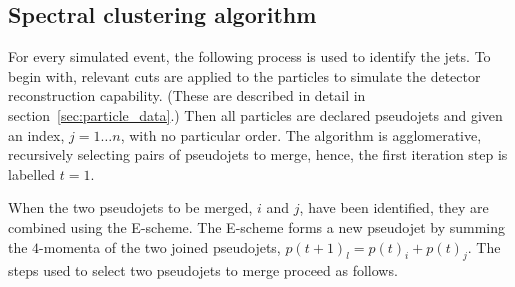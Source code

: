 \subsection{Spectral clustering algorithm}\label{sec:spectralmethodalgo}
    For every simulated event, the following process is used to identify the jets.
    To begin with, relevant cuts are applied to the particles to simulate the detector
    reconstruction capability.
    (These are described in detail in section~\ref{sec:particle_data}.)
    Then all particles are declared pseudojets  and given an index, \(j = 1 \dots n\), with no particular order.
    The algorithm is agglomerative, recursively selecting pairs of pseudojets to merge,
    hence, the first iteration step is labelled \(t=1\).

    When the two pseudojets to be merged, \(i\) and \(j\), have been identified, they are combined
    using the E-scheme.
    The E-scheme forms a new pseudojet by summing the \(4\)-momenta of the two joined pseudojets,
    \(p(t+1)_l = p(t)_i + p(t)_j\).
    The steps used to select two pseudojets to merge proceed as follows.


